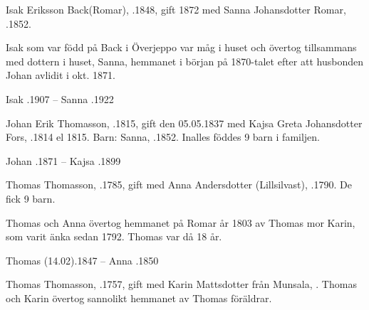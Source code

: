 Isak Eriksson Back(Romar), .1848, gift 1872 med Sanna Johansdotter Romar, .1852.
\begin{jhchildren}
  \item {}
  \item {}
  \item {}
  \item {}
  \item {}
  \item {}
  \item {}
\end{jhchildren}
Isak som var född på Back i Överjeppo var måg i huset och övertog tillsammans med dottern i huset, Sanna, hemmanet i början på 1870-talet efter att husbonden Johan avlidit i okt. 1871.

Isak .1907  --  Sanna .1922


Johan Erik Thomasson, .1815, gift den 05.05.1837 med Kajsa Greta Johansdotter Fors, .1814 el 1815.
Barn: Sanna, .1852. Inalles föddes 9 barn i familjen.

Johan .1871  --  Kajsa .1899


Thomas Thomasson, .1785, gift med Anna Andersdotter (Lillsilvast), .1790. De fick 9 barn.
\begin{jhchildren}
  \item {}
  \item {}
\end{jhchildren}
Thomas och Anna övertog hemmanet på Romar år 1803 av Thomas mor Karin, som varit änka sedan 1792. Thomas var då 18 år.

Thomas (14.02).1847  --  Anna .1850


Thomas Thomasson, .1757, gift med Karin Mattsdotter från Munsala, . Thomas och Karin övertog sannolikt hemmanet av Thomas föräldrar.
\begin{jhchildren}
  \item {}
  \item {}
\end{jhchildren}

